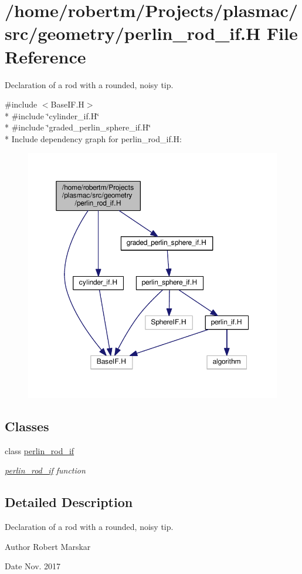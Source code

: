 \hypertarget{perlin__rod__if_8H}{}\section{/home/robertm/\+Projects/plasmac/src/geometry/perlin\+\_\+rod\+\_\+if.H File Reference}
\label{perlin__rod__if_8H}


Declaration of a rod with a rounded, noisy tip.  


{\ttfamily \#include $<$Base\+I\+F.\+H$>$}\\*
{\ttfamily \#include \char`\"{}cylinder\+\_\+if.\+H\char`\"{}}\\*
{\ttfamily \#include \char`\"{}graded\+\_\+perlin\+\_\+sphere\+\_\+if.\+H\char`\"{}}\\*
Include dependency graph for perlin\+\_\+rod\+\_\+if.\+H\+:\nopagebreak
\begin{figure}[H]
\begin{center}
\leavevmode
\includegraphics[width=350pt]{perlin__rod__if_8H__incl}
\end{center}
\end{figure}
\subsection*{Classes}
\begin{DoxyCompactItemize}
\item 
class \hyperlink{classperlin__rod__if}{perlin\+\_\+rod\+\_\+if}
\begin{DoxyCompactList}\small\item\em \hyperlink{classperlin__rod__if}{perlin\+\_\+rod\+\_\+if} function \end{DoxyCompactList}\end{DoxyCompactItemize}


\subsection{Detailed Description}
Declaration of a rod with a rounded, noisy tip. 

\begin{DoxyAuthor}{Author}
Robert Marskar 
\end{DoxyAuthor}
\begin{DoxyDate}{Date}
Nov. 2017 
\end{DoxyDate}
